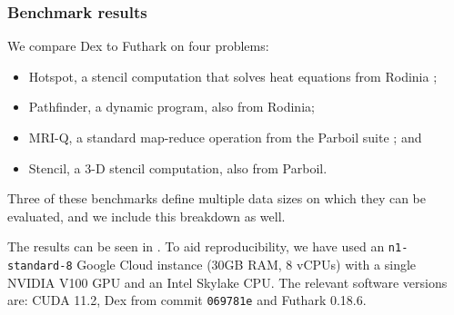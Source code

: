 \documentclass[acmsmall,screen,nonacm]{acmart}
\begin{document}
\subsubsection{Benchmark results}
\label{sec:benchmark-results}




We compare Dex to Futhark on four problems:
\begin{itemize}
\item Hotspot, a stencil computation that solves heat equations from Rodinia \cite{che2009rodinia};
\item Pathfinder, a dynamic program, also from Rodinia;
\item MRI-Q, a standard map-reduce operation from the Parboil suite \cite{stratton2012parboil}; and
\item Stencil, a 3-D stencil computation, also from Parboil.
\end{itemize}
Three of these benchmarks define multiple data sizes on which they can be evaluated, and we include this breakdown as well.

The results can be seen in .
To aid reproducibility, we have used an \texttt{n1-standard-8} Google Cloud instance (30GB RAM, 8 vCPUs) with a single NVIDIA V100 GPU and an Intel Skylake CPU.
The relevant software versions are: CUDA 11.2, Dex from commit \texttt{069781e} and Futhark 0.18.6.
\end{document}
